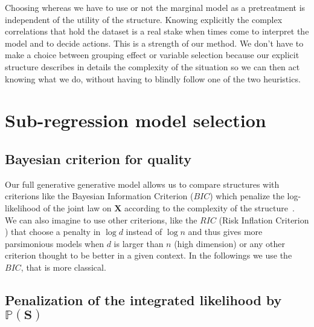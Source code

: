 \documentclass[12pt,a4paper]{report}
\begin{document}
	  Choosing whereas we have to use or not the marginal model as a pretreatment is independent of the utility of the structure. Knowing explicitly the complex correlations that hold the dataset is a real stake when times come to interpret the model and to  decide actions. This is a strength of our method. We don't have to make a choice between grouping effect or variable selection because our explicit structure describes in details the complexity of the situation so we can then act knowing what we do, without having to blindly follow one of the two heuristics.

\section{Sub-regression model selection}	

			\subsection{Bayesian criterion for quality}
			
			
		Our full generative generative model allows us to compare structures with criterions like the Bayesian Information Criterion ($BIC$) which penalize the log-likelihood of the joint law on $\boldsymbol{X}$ according to the complexity of the structure~\cite{BIChuard}. \\
		
		
			 We can also imagine to use other criterions, like the $RIC$ (Risk Inflation Criterion ) that choose a penalty in $\log d$ instead of $\log n$ \cite{foster1994risk} and thus gives more parsimonious models when $d$ is larger than $n$ (high dimension) or any other criterion \cite{george1993variable} thought to be better in a given context.
		In the followings we use the $BIC$, that is more classical.
		
		
		\subsection{Penalization of the integrated likelihood by $\mathbb{P}(\boldsymbol{S})$} \label{compstruct}
		
\end{document}
